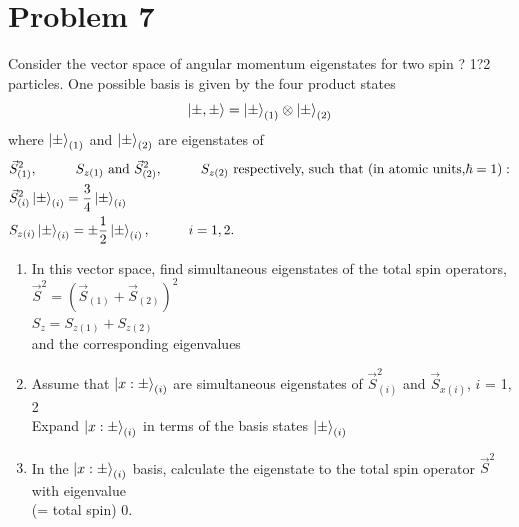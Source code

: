 \documentclass{article}
\begin{document}
\section*{Problem 7} 
Consider the vector space of angular momentum eigenstates for two spin ? 1?2 particles. One possible basis is given by the four product states
\[ \ket{\pm, \pm} = \ket{\pm}_{(1)} \otimes \ket{\pm}_{(2)} \]
where $\ket{\pm}_{(1)}$ and $\ket{\pm}_{(2)}$ are eigenstates of
\begin{align*}
	& \vec{S}_{(1)}^2, \hspace{1cm} S_{z(1)} \text{ and } \vec{S}_{(2)}^2, \hspace{1cm} S_{z(2)} \text{ respectively, such that (in atomic units,} \hbar = 1): \\
	& \vec{S}_{(i)}^2 \ket{\pm}_{(i)} = \frac{3}{4}\ket{\pm}_{(i)} \\
	& S_{z(i)} \ket{\pm}_{(i)} = \pm\frac{1}{2}\ket{\pm}_{(i)}, \hspace{1cm} i = 1, 2.
	\end{align*}
\begin{enumerate}[label=\alph*)]
	\item %
	In this vector space, find simultaneous eigenstates of the total spin operators, \\
	$ \vec{S}^2 = \left(\vec{S}_{(1)} + \vec{S}_{(2)}\right)^2$ \\
	$ S_z = S_{z(1)} + S_{z(2)}$ \\
	and the corresponding eigenvalues
	\item %
	Assume that $\ket{x:\pm}_{(i)}$ are simultaneous eigenstates of $\vec{S}_{(i)}^2$   and $\vec{S}_{x(i)}$, $i$ = 1, 2 \\
	Expand $\ket{x:\pm}_{(i)}$ in terms of the basis states $\ket{\pm}_{(i)}$
	\item %
	In the $\ket{x:\pm}_{(i)}$ basis, calculate the eigenstate to the total spin operator $\vec{S}^2$ with eigenvalue\\
	(= total spin) 0.
\end{enumerate}
\end{document}
